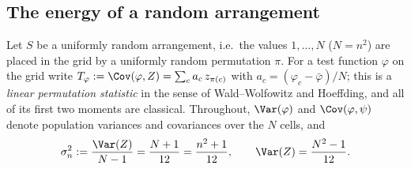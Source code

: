 
\subsection{The energy of a random arrangement}
\label{sec:random_energy}

Let $S$ be a uniformly random arrangement, i.e.\ the values $1,\dots,N$ ($N=n^2$) are placed in the
grid by a uniformly random permutation $\pi$. For a test function $\varphi$ on the grid write
$T_\varphi := \Cov(\varphi,Z) = \sum_{c} a_c\, z_{\pi(c)}$ with $a_c=(\varphi_c-\bar\varphi)/N$;
this is a \emph{linear permutation statistic} in the sense of Wald--Wolfowitz and Hoeffding, and all
of its first two moments are classical. Throughout, $\Var(\varphi)$ and $\Cov(\varphi,\psi)$ denote
population variances and covariances over the $N$ cells, and
\[
\sigma_n^2 := \frac{\Var(Z)}{N-1} = \frac{N+1}{12} = \frac{n^2+1}{12},
\qquad \Var(Z)=\frac{N^2-1}{12}.
\]

